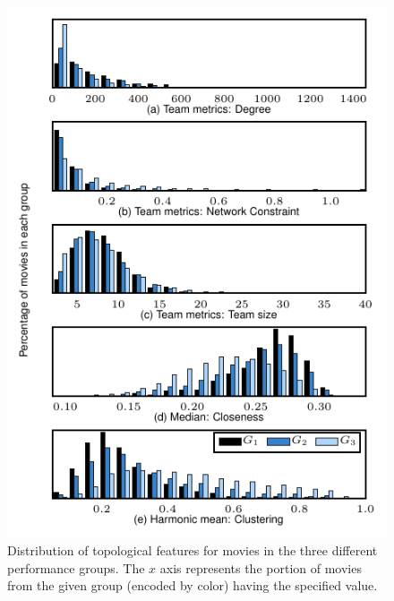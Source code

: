 \begin{figure}[H]\begin{center}
\includegraphics[width=0.78\columnwidth]{../../images/features_hist_top.pdf}
\caption{\label{fig:hist_feat_top}Distribution of topological features for
movies in the three different performance groups. The $x$ axis represents the
portion of movies from the given group (encoded by color) having the specified
value.}
\end{center}\end{figure}


